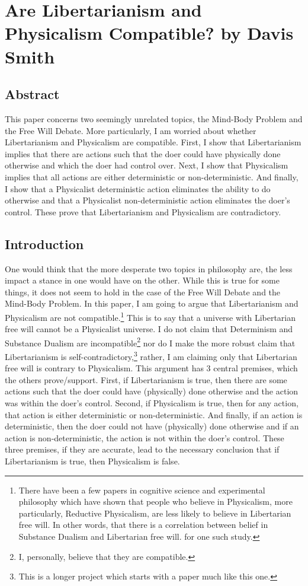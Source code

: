 \chapter{Are Libertarianism and Physicalism Compatible? by Davis Smith}
\label{libertarianismphysicalism}
\section{Abstract}
\setcounter{fc}{\thefootnote}
\setcounter{footnote}{0}

This paper concerns two seemingly unrelated topics, the Mind-Body Problem and the Free Will Debate. More particularly, I am worried about whether Libertarianism and Physicalism are compatible. First, I show that Libertarianism implies that there are actions such that the doer could have physically done otherwise and which the doer had control over. Next, I show that Physicalism implies that all actions are either deterministic or non-deterministic. And finally, I show that a Physicalist deterministic action eliminates the ability to do otherwise and that a Physicalist non-deterministic action eliminates the doer’s control. These prove that Libertarianism and Physicalism are contradictory.
\section{Introduction}

One would think that the more desperate two topics in philosophy are, the less impact a stance in one would have on the other. While this is true for some things, it does not seem to hold in the case of the Free Will Debate and the Mind-Body Problem. In this paper, I am going to argue that Libertarianism and Physicalism are not compatible.\footnote{There have been a few papers in cognitive science and experimental philosophy which have shown that people who believe in Physicalism, more particularly, Reductive Physicalism, are less likely to believe in Libertarian free will. In other words, that there is a correlation between belief in Substance Dualism and Libertarian free will. \cite{Wisniewski1} for one such study.} This is to say that a universe with Libertarian free will cannot be a Physicalist universe. I do not claim that Determinism and Substance Dualism are incompatible\footnote{I, personally, believe that they are compatible.} nor do I make the more robust claim that Libertarianism is self-contradictory,\footnote{This is a longer project which starts with a paper much like this one.} rather, I am claiming only that Libertarian free will is contrary to Physicalism. This argument has 3 central premises, which the others prove/support. First, if Libertarianism is true, then there are some actions such that the doer could have (physically) done otherwise and the action was within the doer's control. Second, if Physicalism is true, then for any action, that action is either deterministic or non-deterministic. And finally, if an action is deterministic, then the doer could not have (physically) done otherwise and if an action is non-deterministic, the action is not within the doer’s control. These three premises, if they are accurate, lead to the necessary conclusion that if Libertarianism is true, then Physicalism is false.
